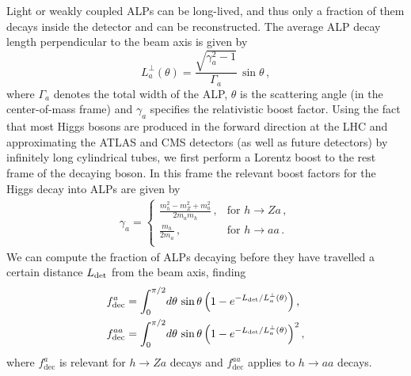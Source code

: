 Light or weakly coupled ALPs can be long-lived, and thus only a fraction of them decays inside the detector and can be reconstructed. The average ALP decay length perpendicular to the beam axis is given by
%
\begin{equation}\label{eq:Lperp}
   L_a^\perp(\theta) = \frac{\sqrt{\gamma_a^2 - 1}}{\Gamma_a}\,\sin\theta \,, 
\end{equation}
%
where $\Gamma_a$ denotes the total width of the ALP, $\theta$ is the scattering angle (in the center-of-mass frame) and $\gamma_a$ specifies the relativistic boost factor. Using the fact that most Higgs bosons are produced in the forward direction at the LHC and approximating the ATLAS and CMS detectors (as well as future detectors) by infinitely long cylindrical tubes, we first perform a Lorentz boost to the rest frame of the decaying boson. In this frame the relevant boost factors for the Higgs decay into ALPs are given by
\begin{align}
\gamma_a=\begin{cases}\displaystyle{ \frac{m_h^2-m_Z^2+m_a^2}{2m_am_h}}\,,& \text{for}\,\, h \to Z a\,,\\[14pt]
\displaystyle \frac{m_h}{2m_a}\,,&\text{for}\,\, h \to aa\,.\\
\end{cases}
\end{align}
%
We can compute the fraction of ALPs decaying before they have travelled a certain distance $L_{\rm det}$ from the beam axis, finding 
%
\begin{equation}\label{eq:ffactors}
\begin{aligned}
   f_{\rm dec}^{a} &= \int_0^{\pi/2}\!d\theta \,  \sin\theta
    \left( 1 - e^{-L_{\rm det}/L_a^\perp(\theta)} \right) , \\
   f_{\rm dec}^{aa} &= \int_0^{\pi/2}\!d\theta \,  \sin\theta
    \left( 1 - e^{-L_{\rm det}/L_a^\perp(\theta)} \right)^2,
\end{aligned}
\end{equation} 
%
where $f^a_\text{dec}$ is relevant for $h \to Z a$ decays and $f^{aa}_\text{dec}$ applies to $h\to aa$ decays. 

